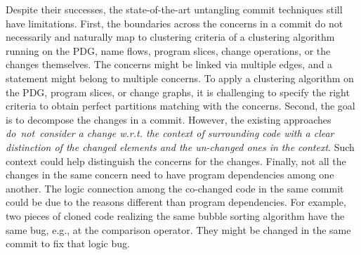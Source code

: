 

Despite their successes, the state-of-the-art untangling commit
techniques still have limitations. First, the boundaries across the
concerns in a commit do not necessarily and naturally map to
clustering criteria of a clustering algorithm running on the PDG, name
flows, program slices, change operations, or the changes
themselves. The concerns might be linked via multiple edges, and a
statement might belong to multiple concerns. To apply a clustering
algorithm on the PDG, program slices, or change graphs, it is
challenging to specify the right criteria to obtain perfect partitions
matching with the concerns.
%
Second, the goal is to decompose the changes in a commit. However, the
existing approaches {\em do~not~consider a change w.r.t. the context
  of surrounding code with a clear distinction of the changed elements
  and the un-changed ones in the context}. Such context could help
distinguish the concerns for the changes. Finally, not all the changes
in the same concern need to have program dependencies among one
another. The logic connection among the co-changed code in the same
commit could be due to the reasons different than program
dependencies. For example, two pieces of cloned code realizing the
same bubble sorting algorithm have the same bug, e.g., at the
comparison operator. They might be changed in the same commit to fix
that logic bug.


